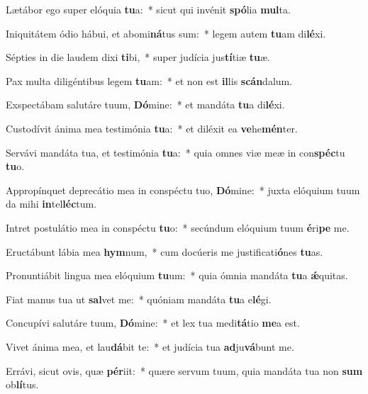 \item Lætábor ego super elóquia \textbf{tu}a:~* sicut qui invénit \textbf{spó}lia \textbf{mul}ta.
\item Iniquitátem ódio hábui, et abomi\textbf{ná}tus sum:~* legem autem \textbf{tu}am di\textbf{lé}xi.
\item Sépties in die laudem dixi \textbf{ti}bi,~* super judícia jus\textbf{tí}tiæ \textbf{tu}æ.
\item Pax multa diligéntibus legem \textbf{tu}am:~* et non est \textbf{il}lis \textbf{scán}dalum.
\item Exspectábam salutáre tuum, \textbf{Dó}mine:~* et mandáta \textbf{tu}a di\textbf{lé}xi.
\item Custodívit ánima mea testimónia \textbf{tu}a:~* et diléxit ea \textbf{ve}he\textbf{mén}ter.
\item Servávi mandáta tua, et testimónia \textbf{tu}a:~* quia omnes viæ meæ in con\textbf{spéc}tu \textbf{tu}o.
\item Appropínquet deprecátio mea in conspéctu tuo, \textbf{Dó}mine:~* juxta elóquium tuum da mihi \textbf{in}tel\textbf{léc}tum.
\item Intret postulátio mea in conspéctu \textbf{tu}o:~* secúndum elóquium tuum \textbf{é}ri\textbf{pe} me.
\item Eructábunt lábia mea \textbf{hym}num,~* cum docúeris me justificati\textbf{ó}nes \textbf{tu}as.
\item Pronuntiábit lingua mea elóquium \textbf{tu}um:~* quia ómnia mandáta \textbf{tu}a \textbf{ǽ}quitas.
\item Fiat manus tua ut \textbf{sal}vet me:~* quóniam mandáta \textbf{tu}a e\textbf{lé}gi.
\item Concupívi salutáre tuum, \textbf{Dó}mine:~* et lex tua medi\textbf{tá}tio \textbf{me}a est.
\item Vivet ánima mea, et lau\textbf{dá}bit te:~* et judícia tua \textbf{ad}ju\textbf{vá}bunt me.
\item Errávi, sicut ovis, quæ \textbf{pér}iit:~* quære servum tuum, quia mandáta tua non \textbf{sum} ob\textbf{lí}tus.
